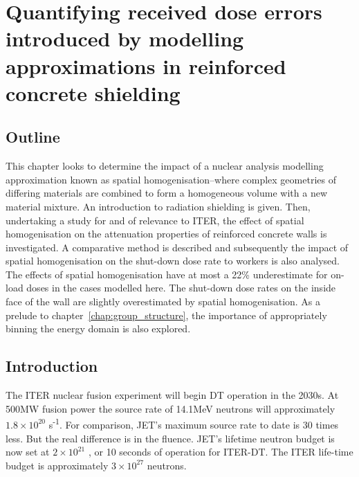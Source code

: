 
\chapter{Quantifying received dose errors introduced by modelling approximations in reinforced concrete shielding}
\label{chap:homogenisation}

\ifpdf
    \graphicspath{{Chapter2/Figs/Raster/}{Chapter2/Figs/PDF/}{Chapter2/Figs/}}
\else
    \graphicspath{{Chapter2/Figs/Vector/}{Chapter2/Figs/}}
\fi


\section{Outline}
This chapter looks to determine the impact of a nuclear analysis modelling approximation known as spatial homogenisation--where complex geometries of differing materials are combined to form a homogeneous volume with a new material mixture. An introduction to radiation shielding is given. Then, undertaking a study for and of relevance to ITER, the effect of spatial homogenisation on the attenuation properties of reinforced concrete walls is investigated. A comparative method is described and subsequently the impact of spatial homogenisation on the shut-down dose rate to workers is also analysed. The effects of spatial homogenisation have at most a 22\% underestimate for on-load doses in the cases modelled here. The shut-down dose rates on the inside face of the wall are slightly overestimated by spatial homogenisation. As a prelude to chapter~\ref{chap:group_structure}, the importance of appropriately binning the energy domain is also explored.  

\section{Introduction}
The ITER nuclear fusion experiment will begin DT operation in the 2030s. At 500MW fusion power the source rate of 14.1MeV neutrons will approximately $1.8\times10^{20}$ s\textsuperscript{-1}. For comparison, JET's maximum source rate to date is 30 times less. But the real difference is in the fluence. JET's lifetime neutron budget is now set at $2\times10^{21}$ \cite{Lobel2008}, or 10 seconds of operation for ITER-DT. The ITER life-time budget is approximately $3\times10^{27}$ neutrons.

